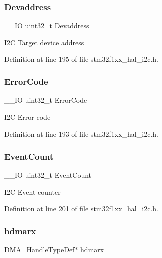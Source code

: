 \subsubsection{\texorpdfstring{Devaddress}{Devaddress}}
{\footnotesize\ttfamily \+\_\+\+\_\+\+IO uint32\+\_\+t Devaddress}

I2C Target device address 

Definition at line 195 of file stm32f1xx\+\_\+hal\+\_\+i2c.\+h.

\mbox{\label{struct_i2_c___handle_type_def_a123c5063e6a3b1901b2fbe5f88c53a7e}} 
\subsubsection{\texorpdfstring{Error\+Code}{ErrorCode}}
{\footnotesize\ttfamily \+\_\+\+\_\+\+IO uint32\+\_\+t Error\+Code}

I2C Error code 

Definition at line 193 of file stm32f1xx\+\_\+hal\+\_\+i2c.\+h.

\mbox{\label{struct_i2_c___handle_type_def_a5b9ab6922825ed4ab1bfeef04f18b90a}} 
\subsubsection{\texorpdfstring{Event\+Count}{EventCount}}
{\footnotesize\ttfamily \+\_\+\+\_\+\+IO uint32\+\_\+t Event\+Count}

I2C Event counter 

Definition at line 201 of file stm32f1xx\+\_\+hal\+\_\+i2c.\+h.

\mbox{\label{struct_i2_c___handle_type_def_abd0aeec20298a55d89a440320e35634f}} 
\subsubsection{\texorpdfstring{hdmarx}{hdmarx}}
{\footnotesize\ttfamily \hyperlink{group___d_m_a___exported___types_ga92b907d56a9c29b93d46782a7a04f91e}{D\+M\+A\+\_\+\+Handle\+Type\+Def}$\ast$ hdmarx}

